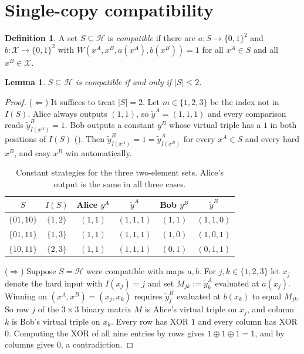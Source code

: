 \documentclass[12pt,a4paper]{article}
\newtheorem{lemma}[theorem]{Lemma}
\theoremstyle{definition}
\newtheorem{definition}[theorem]{Definition}
\theoremstyle{remark}
\newcommand{\ytA}{\tilde{y}^{A}}
\newcommand{\ytB}{\tilde{y}^{B}}
\newcommand{\xor}{\oplus}
\newcommand{\Hd}{\mathcal{H}}   %
\newcommand{\Xall}{\mathcal{X}} %
\begin{document}
\section{Single-copy compatibility}
\label{sec:single}

\begin{definition}
\label{def:compat}
A set $S \subseteq \Hd$ is \emph{compatible} if there are $a: S \to \{0,1\}^2$ and $b: \Xall \to \{0,1\}^2$ with $W(x^A,x^B,a(x^A),b(x^B)) = 1$ for all $x^A \in S$ and all $x^B \in \Xall$.
\end{definition}

\begin{lemma}
\label{lem:single}
$S \subseteq \Hd$ is compatible if and only if $|S| \le 2$.
\end{lemma}

\begin{proof}
($\Leftarrow$) It suffices to treat $|S|=2$. Let $m \in \{1,2,3\}$ be the index not in $I(S)$. Alice always outputs $(1,1)$, so $\ytA = (1,1,1)$ and every comparison reads $\ytB_{I(x^A)} = 1$. Bob outputs a constant $y^B$ whose virtual triple has a $1$ in both positions of $I(S)$ (). Then $\ytB_{I(x^A)} = 1 = \ytA_{I(x^B)}$ for every $x^A\in S$ and every hard $x^B$, and easy $x^B$ win automatically.

\begin{table}[H]
\centering
\caption{Constant strategies for the three two-element sets. Alice's output is the same in all three cases.}
\label{tab:strategies}
\begin{tabular}{cccccc}
\toprule
$S$ & $I(S)$ & Alice $y^A$ & $\ytA$ & Bob $y^B$ & $\ytB$ \\
\midrule
$\{01,10\}$ & $\{1,2\}$ & $(1,1)$ & $(1,1,1)$ & $(1,1)$ & $(1,1,0)$ \\
$\{01,11\}$ & $\{1,3\}$ & $(1,1)$ & $(1,1,1)$ & $(1,0)$ & $(1,0,1)$ \\
$\{10,11\}$ & $\{2,3\}$ & $(1,1)$ & $(1,1,1)$ & $(0,1)$ & $(0,1,1)$ \\
\bottomrule
\end{tabular}
\end{table}

($\Rightarrow$) Suppose $S=\Hd$ were compatible with maps $a,b$. For $j,k\in\{1,2,3\}$ let $x_j$ denote the hard input with $I(x_j)=j$ and set $M_{jk} := \ytA_k$ evaluated at $a(x_j)$. Winning on $(x^A,x^B)=(x_j,x_k)$ requires $\ytB_j$ evaluated at $b(x_k)$ to equal $M_{jk}$. So row $j$ of the $3\times 3$ binary matrix $M$ is Alice's virtual triple on $x_j$, and column $k$ is Bob's virtual triple on $x_k$. Every row has XOR $1$ and every column has XOR $0$. Computing the XOR of all nine entries by rows gives $1\xor1\xor1=1$, and by columns gives $0$, a contradiction.
\end{proof}
\end{document}
